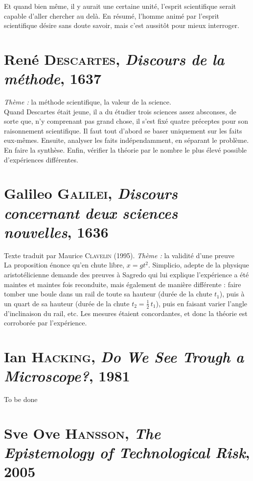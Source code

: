 \documentclass{report}
\begin{document}
	Et quand bien même, il y aurait une certaine unité, l'esprit scientifique serait capable d'aller chercher au delà. En résumé, l'homme animé par l'esprit scientifique désire sans doute savoir, mais c'est aussitôt pour mieux interroger.
	
	\section{René \textsc{Descartes}, \textit{Discours de la méthode}, 1637}
	\textit{Thème :} la méthode scientifique, la valeur de la science. \\
	
	Quand Descartes était jeune, il a du étudier trois sciences assez absconses,  de sorte que, n'y comprenant pas grand chose, il s'est fixé quatre préceptes pour son raisonnement scientifique. Il faut tout d'abord se baser uniquement sur les faits eux-mêmes. Ensuite, analyser les faits indépendamment, en séparant le problème. En faire la synthèse. Enfin, vérifier la théorie par le nombre le plus élevé possible d'expériences différentes.
	
	\section{Galileo \textsc{Galilei}, \textit{Discours concernant deux sciences nouvelles}, 1636}
	Texte traduit par Maurice \textsc{Clavelin} (1995). \textit{Thème : } la validité d'une preuve \\
	
	La proposition énonce qu'en chute libre, $x=gt^2$. Simplicio, adepte de la physique aristotélicienne demande des preuves à Sagredo qui lui explique l'expérience a été maintes et maintes fois reconduite, mais également de manière différente : faire tomber une boule dans un rail de toute sa hauteur (durée de la chute $t_1$), puis à un quart de sa hauteur (durée de la chute $t_2 = \frac{1}{2}\, t_1$), puis en faisant varier l'angle d'inclinaison du rail, etc. Les mesures étaient concordantes, et donc la théorie est corroborée par l'expérience.
	
	\section{Ian \textsc{Hacking}, \textit{Do We See Trough a Microscope?}, 1981}
	To be done
	
	\section{Sve Ove \textsc{Hansson}, \textit{The Epistemology of Technological Risk}, 2005}
	
\end{document}
